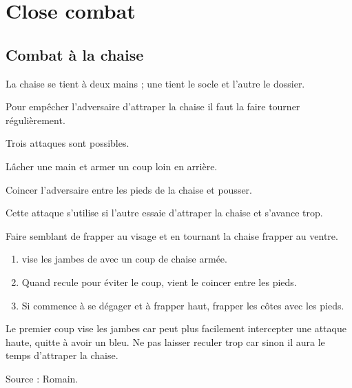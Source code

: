 \chapter{Close combat}



\section{Combat à la chaise}

La chaise se tient à deux mains ; une tient le socle et l'autre le dossier.

Pour empêcher l'adversaire d'attraper la chaise il faut la faire tourner régulièrement.

Trois attaques sont possibles.

\begin{coup}
\label{coup:close-combat:chaise:frappe-armée}

Lâcher une main et armer un coup loin en arrière.
\end{coup}

\begin{coup}
\label{coup:close-combat:chaise:coincer}

Coincer l'adversaire entre les pieds de la chaise et pousser.

Cette attaque s'utilise si l'autre essaie d'attraper la chaise et s'avance trop.
\end{coup}

\begin{coup}
\label{coup:close-combat:chaise:coup-pied}

Faire semblant de frapper au visage et en tournant la chaise frapper au ventre.
\end{coup}


\begin{technique}

\begin{enumerate}
	\item \A vise les jambes de \D avec un coup de chaise armée.
	
	\item Quand \D recule pour éviter le coup, \A vient le coincer entre les pieds.
	
	\item Si \D commence à se dégager et à frapper haut, frapper les côtes avec les pieds.
\end{enumerate}

Le premier coup vise les jambes car \D peut plus facilement intercepter une attaque haute, quitte à avoir un bleu.
Ne pas laisser \D reculer trop car sinon il aura le temps d'attraper la chaise.

Source : Romain.
\end{technique}


